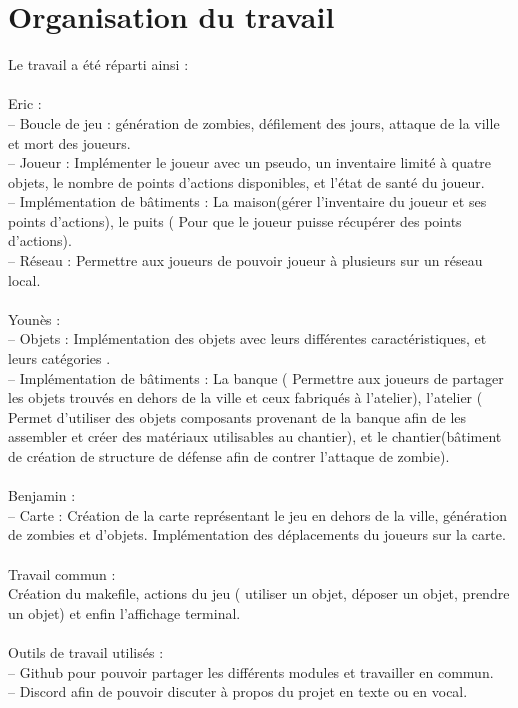 \documentclass[a4paper,11pt]{article}
\begin{document}
\section {Organisation du travail}
Le travail a été réparti ainsi :
\\
\\
Eric :
\\
– Boucle de jeu : génération de zombies, défilement des jours, attaque de la ville et mort des joueurs.
\\
– Joueur : Implémenter le joueur avec un pseudo, un inventaire limité à quatre objets, le nombre de points d'actions disponibles, et l'état de santé du joueur.
\\
– Implémentation de bâtiments : La maison(gérer l'inventaire du joueur et ses points d'actions), le puits ( Pour que le joueur puisse récupérer des points d'actions).
\\
– Réseau : Permettre aux joueurs de pouvoir joueur à plusieurs sur un réseau local.
\\
\\
Younès :
\\
– Objets : Implémentation des objets avec leurs différentes caractéristiques, et leurs catégories .
\\
– Implémentation de bâtiments : La banque ( Permettre aux joueurs de partager les objets trouvés en dehors de la ville et ceux fabriqués à l'atelier), l'atelier ( Permet d'utiliser des objets composants provenant de la banque afin de les assembler et créer des matériaux utilisables au chantier), et le chantier(bâtiment de création de structure de défense afin de contrer l'attaque de zombie).
\\
\\
Benjamin :
\\
– Carte : Création de la carte représentant le jeu en dehors de la ville, génération de zombies et d'objets. Implémentation des déplacements du joueurs sur la carte.
\\
\\
Travail commun :
\\
Création du makefile, actions du jeu ( utiliser un objet, déposer un objet, prendre un objet) et enfin l'affichage terminal.
\\
\\
Outils de travail utilisés :
\\
– Github pour pouvoir partager les différents modules et travailler en commun.
\\
– Discord afin de pouvoir discuter à propos du projet en texte ou en vocal.
\end{document}
